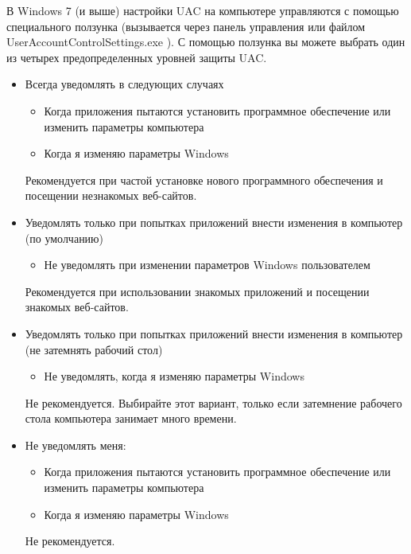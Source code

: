 \documentclass[a4paper, 14pt]{report}
\begin{document}
В Windows 7 (и выше) настройки UAC на компьютере управляются с помощью специального ползунка (вызывается через панель управления или файлом UserAccountControlSettings.exe ).
С помощью ползунка вы можете выбрать один из четырех предопределенных уровней защиты UAC.
\begin{itemize}
    \item {Всегда уведомлять в следующих случаях
          \begin{itemize}
              \item Когда приложения пытаются установить
                    программное обеспечение или изменить
                    параметры компьютера
              \item Когда я изменяю параметры Windows
          \end{itemize}
          \textcolor{blue}{\faInfoCircle} Рекомендуется при частой установке нового
          программного обеспечения и посещении
          незнакомых веб-сайтов.
          }
    \item {Уведомлять только при попытках приложений внести изменения в компьютер (по умолчанию)
          \begin{itemize}
              \item Не уведомлять при изменении параметров Windows пользователем
          \end{itemize}
          \textcolor{blue}{\faInfoCircle} Рекомендуется при использовании знакомых
          приложений и посещении знакомых веб-сайтов.
          }
    \item Уведомлять только при попытках приложений
          внести изменения в компьютер (не затемнять
          рабочий стол)
          {\begin{itemize}
                      \item Не уведомлять, когда я изменяю параметры Windows
                  \end{itemize}
              }
          \textcolor{blue}{\faInfoCircle} Не рекомендуется. Выбирайте этот вариант,
          только если затемнение рабочего стола
          компьютера занимает много времени.
    \item {Не уведомлять меня:
          \begin{itemize}
              \item Когда приложения пытаются установить
                    программное обеспечение или изменить
                    параметры компьютера
              \item Когда я изменяю параметры Windows
          \end{itemize}
          \textcolor{blue}{\faInfoCircle} Не рекомендуется.          }
\end{itemize}
\end{document}
